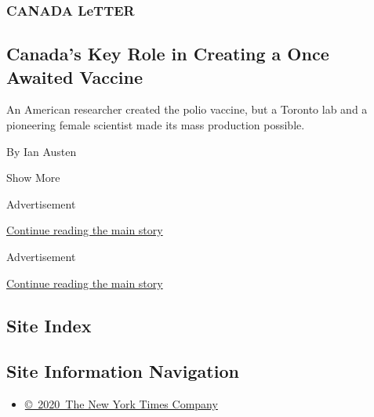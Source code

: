\begin{enumerate}
  \hypertarget{canada-letter}{%
  \subsubsection{CANADA LeTTER}\label{canada-letter}}

  \hypertarget{canadas-key-role-in-creating-a-once-awaited-vaccine}{%
  \subsection{Canada's Key Role in Creating a Once Awaited
  Vaccine}\label{canadas-key-role-in-creating-a-once-awaited-vaccine}}

  An American researcher created the polio vaccine, but a Toronto lab
  and a pioneering female scientist made its mass production possible.

  By Ian Austen
\end{enumerate}

Show More

Advertisement

\protect\hyperlink{after-mid1}{Continue reading the main story}

Advertisement

\protect\hyperlink{after-mktg}{Continue reading the main story}

\hypertarget{site-index}{%
\subsection{Site Index}\label{site-index}}

\hypertarget{site-information-navigation}{%
\subsection{Site Information
Navigation}\label{site-information-navigation}}

\begin{itemize}
\tightlist
\item
  \href{https://help.nytimes.com/hc/en-us/articles/115014792127-Copyright-notice}{©~2020~The
  New York Times Company}
\end{itemize}

